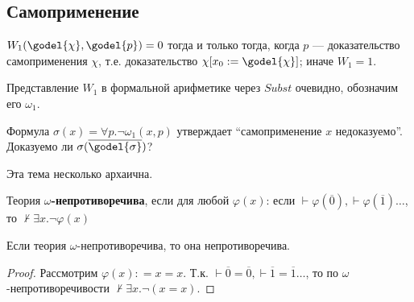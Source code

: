 \subsection{Самоприменение}

\begin{definition}
	\(W_1(\godel{\chi}, \godel{p}) = 0\) тогда и только тогда, когда \(p\) --- доказательство самоприменения \(\chi\), т.е. доказательство \(\chi[x_0 : = \godel{\chi}]\); иначе \(W_1 = 1\).
\end{definition}

Представление \(W_1\) в формальной арифметике через \(Subst\) очевидно, обозначим его \(\omega_1\).

Формула \(\sigma(x) = \forall p.\neg \omega_1(x, p)\) утверждает ``самоприменение \(x\) недоказуемо''. Доказуемо ли \(\sigma(\overline{\godel{\sigma}})\)?

\begin{remark}
	Эта тема несколько архаична.
\end{remark}

\begin{definition}
	Теория \textbf{\(\omega\)-непротиворечива}, если для любой \(\varphi(x)\): если \(\vdash \varphi(\overline{0}), \vdash \varphi(\overline{1}) \dots \), то \(\nvdash \exists x.\neg \varphi(x)\)
\end{definition}

\begin{theorem}
	Если теория \(\omega\)-непротиворечива, то она непротиворечива.
\end{theorem}
\begin{proof}
	Рассмотрим \(\varphi(x) : = x = x\). Т.к. \(\vdash \overline 0 = \overline 0, \vdash \overline 1 = \overline 1 \dots\), то по \(\omega\)-непротиворечивости \(\nvdash \exists x.\neg (x = x)\).
\end{proof}

